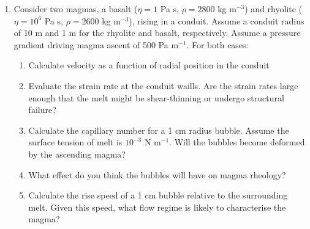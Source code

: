 \documentclass[]{book}
\theoremstyle{definition}
\begin{document}
\begin{enumerate}
\item Consider two magmas, a basalt ($\eta = 1$ Pa s, $\rho = 2800$ kg m$^{-3}$) and rhyolite ($\eta = 10^{6}$ Pa s, $\rho = 2600$ kg m$^{-3}$), rising in a conduit. Assume a conduit radius of 10 m and 1 m for the rhyolite and basalt, respectively. Assume a pressure gradient driving magma ascent of 500 Pa m$^{-1}$. For both cases:

  \begin{enumerate}
  \item Calculate velocity as a function of radial position in the conduit \\
  \item Evaluate the strain rate at the conduit waills. Are the strain rates large enough that the melt might be shear-thinning or undergo structural failure?
  \item Calculate the capillary number for a 1 cm radius bubble. Assume the surface tension of melt is $10^{-3}$ N m$^{-1}$. Will the bubbles become deformed by the ascending magma?
  \item What effect do you think the bubbles will have on magma rheology?
  \item Calculate the rise speed of a 1 cm bubble relative to the surrounding melt. Given this speed, what flow regime is likely to characterise the magma? \\
  \end{enumerate}
\end{enumerate}

  
\end{document}
